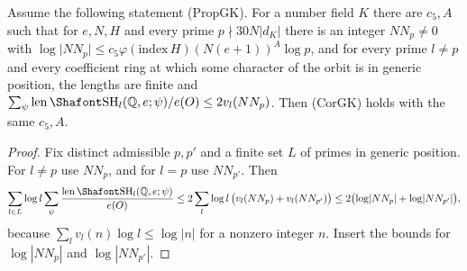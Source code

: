 \begin{proposition}\label{w4:prop:prop2cor}
Assume the following statement (PropGK). For a number field $K$ there are $c_5,A$ such that for $e,N,H$ and every prime $p\nmid30N\lvert d_K\rvert$ there is an integer $NN_p\ne0$ with $\log\lvert NN_p\rvert\le c_5\varphi(\mathrm{index}\,H)(N(e+1))^A\log p$, and for every prime $l\ne p$ and every coefficient ring at which some character of the orbit is in generic position, the lengths are finite and $\sum_\psi\len\Sha_l(\Q,e;\psi)/e(O)\le2v_l(NN_p)$. Then (CorGK) holds with the same $c_5,A$.
\end{proposition}

\begin{proof}
Fix distinct admissible $p,p'$ and a finite set $L$ of primes in generic position. For $l\ne p$ use $NN_p$, and for $l=p$ use $NN_{p'}$. Then
\[
\sum_{l\in L}\log l\sum_\psi\frac{\len\Sha_l(\Q,e;\psi)}{e(O)}\le2\sum_l\log l\,\bigl(v_l(NN_p)+v_l(NN_{p'})\bigr)\le2\bigl(\log\lvert NN_p\rvert+\log\lvert NN_{p'}\rvert\bigr),
\]
because $\sum_lv_l(n)\log l\le\log|n|$ for a nonzero integer $n$. Insert the bounds for $\log|NN_p|$ and $\log|NN_{p'}|$.
\end{proof}

